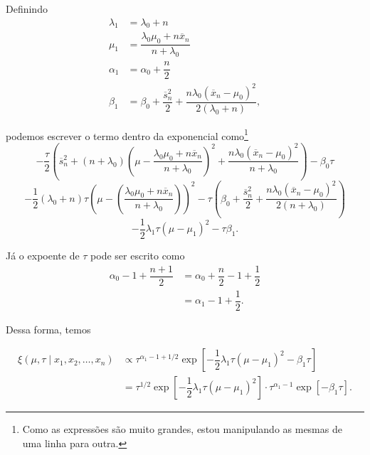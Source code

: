\documentclass{article}
\begin{document}
Definindo
\begin{equation*}
    \begin{split}
        \lambda_1 & = \lambda_0 + n \\
        \mu_1 & = \dfrac{\lambda_0\mu_0 + n\overline{x}_n}{n + \lambda_0} \\
        \alpha_1 & = \alpha_0 + \dfrac{n}{2} \\
        \beta_1 & = \beta_0 + \dfrac{\overline{s}_n^2}{2} + \dfrac{n\lambda_0\left(\overline{x}_n - \mu_0\right)^2}{2\left(\lambda_0 + n\right)},
    \end{split}
\end{equation*}

\noindent podemos escrever o termo dentro da exponencial como\footnote{Como as expressões são muito grandes, estou manipulando as mesmas de uma linha para outra.}
\[-\dfrac{\tau}{2}\left(\overline{s}_n^2 + (n + \lambda_0)\left(\mu - \dfrac{\lambda_0\mu_0 + n\overline{x}_n}{n + \lambda_0}\right)^2 + \dfrac{n\lambda_0 \left(\overline{x}_n - \mu_0\right)^2}{n + \lambda_0}\right) - \beta_0 \tau\]
\[-\dfrac{1}{2}\left(\lambda_0 + n\right)\tau\left(\mu - \left(\dfrac{\lambda_0\mu_0 + n\overline{x}_n}{n + \lambda_0}\right)\right)^2 - \tau\left(\beta_0 + \dfrac{\overline{s}_n^2}{2} + \dfrac{n\lambda_0 \left(\overline{x}_n - \mu_0\right)^2}{2\left(n + \lambda_0\right)}\right)\]
\[-\dfrac{1}{2}\lambda_1\tau\left(\mu - \mu_1\right)^2 - \tau\beta_1.\]

Já o expoente de $\tau$ pode ser escrito como
\begin{equation*}
    \begin{split}
        \alpha_0 - 1 + \dfrac{n + 1}{2} & = \alpha_0 + \dfrac{n}{2} - 1 + \dfrac{1}{2} \\
        & = \alpha_1 - 1 + \dfrac{1}{2}.
    \end{split}
\end{equation*}

Dessa forma, temos

\begin{equation*}
    \begin{split}
        \xi(\mu, \tau \mid x_1, x_2, \dots, x_n) & \propto \tau^{\alpha_1 - 1 + 1/2} \exp{\left[-\dfrac{1}{2}\lambda_1\tau\left(\mu - \mu_1\right)^2 -\beta_1\tau\right]} \\
        & = \tau^{1/2} \exp{\left[-\dfrac{1}{2}\lambda_1\tau\left(\mu - \mu_1\right)^2\right]} \cdot \tau^{\alpha_1 - 1} \exp{\left[-\beta_1\tau\right]}.
    \end{split}
\end{equation*}
\end{document}
